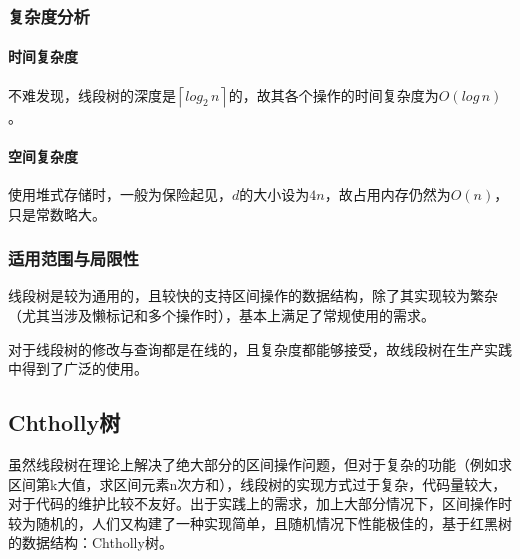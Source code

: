 \documentclass{cjc}
\begin{document}
\subsubsection{复杂度分析}
\paragraph{时间复杂度} 不难发现，线段树的深度是$\left \lceil log_2\,n \right \rceil $的，故其各个操作的时间复杂度为$O(log\,n)$。%
\paragraph{空间复杂度} 使用堆式存储时，一般为保险起见，$d$的大小设为$4n$，故占用内存仍然为$O(n)$，只是常数略大。
\subsubsection{适用范围与局限性}
线段树是较为通用的，且较快的支持区间操作的数据结构，除了其实现较为繁杂（尤其当涉及懒标记和多个操作时），基本上满足了常规使用的需求。

对于线段树的修改与查询都是在线的，且复杂度都能够接受，故线段树在生产实践中得到了广泛的使用。

\subsection{Chtholly树}

虽然线段树在理论上解决了绝大部分的区间操作问题，但对于复杂的功能（例如求区间第k大值，求区间元素n次方和），线段树的实现方式过于复杂，代码量较大，对于代码的维护比较不友好。出于实践上的需求，加上大部分情况下，区间操作时较为随机的，人们又构建了一种实现简单，且随机情况下性能极佳的，基于红黑树的数据结构：Chtholly树。
\end{document}
